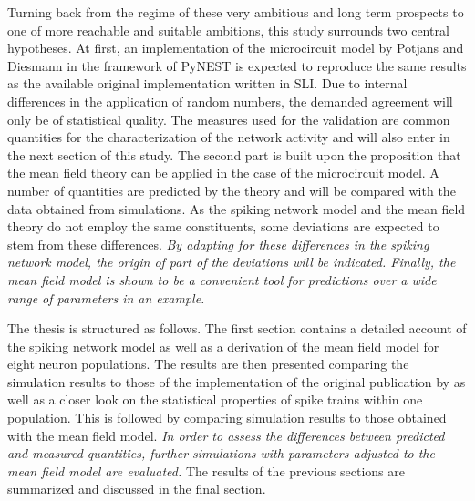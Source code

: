 Turning back from the regime of these very ambitious and long term prospects to 
one of more reachable and suitable ambitions, this study surrounds two central
hypotheses. At first, an implementation of the microcircuit model by
Potjans and Diesmann in the framework of PyNEST is expected to reproduce the 
same results as the available original implementation written in SLI. Due to
internal differences in the application of random numbers, the demanded agreement 
will only be of statistical quality. The measures used for the validation 
are common quantities for the characterization of the network 
activity and will also enter in the next section of this study. 
The second part is built upon the proposition that the mean field theory 
can be applied in the case of the
microcircuit model. A number of quantities are predicted by the theory and will 
be compared with the data obtained from simulations. As the spiking network model 
and the mean field theory do not employ the same constituents, some 
deviations are expected to stem from these differences. 
\emph{By adapting for these
differences in the spiking network model, the origin of part of the deviations 
will be indicated. 
Finally, the mean field model is shown to be a convenient tool for predictions
over a wide range of parameters in an example.}

The thesis is structured as follows. The first section contains a detailed account 
of the spiking network model as well as a derivation of the mean field model 
for eight neuron populations.  
The results are then presented comparing the simulation results to 
those of the implementation of the original publication by 
 as well as a closer look on the statistical properties 
of spike trains within one population. 
This is followed by comparing simulation results to those
obtained with the mean field model. 
\emph{In order to assess the differences between 
predicted and measured quantities, 
further simulations with parameters adjusted 
to the mean field model are evaluated.}
The results of the previous sections are summarized and discussed in the final section. 



